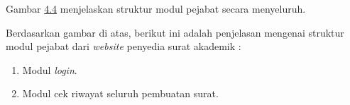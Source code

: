 Gambar \hyperlink{struktur_modul_pejabat}{4.4} menjelaskan struktur modul pejabat secara menyeluruh.


Berdasarkan gambar di atas, berikut ini adalah penjelasan mengenai struktur modul pejabat dari \textit{website} penyedia surat akademik :
\begin{enumerate}
	\item Modul \textit{login}.
	\item Modul cek riwayat seluruh pembuatan surat.
\end{enumerate}

\iffalse
\section{Perancangan Antar Muka}
\label{sec:perancangan_antar_muka}

\section{Perancangan Fisik Basis Data}
\label{sec:perancangan_fisik_basis_data}
\fi